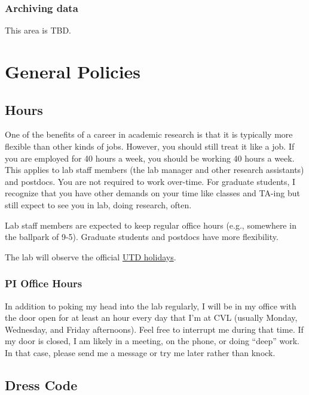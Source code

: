 \documentclass[]{book}
\begin{document}
\hypertarget{archiving-data}{%
\subsection{Archiving data}\label{archiving-data}}

This area is TBD.

\hypertarget{general-policies}{%
\chapter{General Policies}\label{general-policies}}

\hypertarget{hours}{%
\section{Hours}\label{hours}}

One of the benefits of a career in academic research is that it is typically more flexible than other kinds of jobs. However, you should still treat it like a job. If you are employed for 40 hours a week, you should be working 40 hours a week. This applies to lab staff members (the lab manager and other research assistants) and postdocs. You are not required to work over-time. For graduate students, I recognize that you have other demands on your time like classes and TA-ing but still expect to see you in lab, doing research, often.

Lab staff members are expected to keep regular office hours (e.g., somewhere in the ballpark of 9-5). Graduate students and postdocs have more flexibility.

The lab will observe the official \href{https://www.utdallas.edu/hr/news/holidays/}{UTD holidays}.

\hypertarget{pi-office-hours}{%
\subsection{PI Office Hours}\label{pi-office-hours}}

In addition to poking my head into the lab regularly, I will be in my office with the door open for at least an hour every day that I'm at CVL (usually Monday, Wednesday, and Friday afternoons). Feel free to interrupt me during that time. If my door is closed, I am likely in a meeting, on the phone, or doing ``deep'' work. In that case, please send me a message or try me later rather than knock.

\hypertarget{dress-code}{%
\section{Dress Code}\label{dress-code}}
\end{document}
